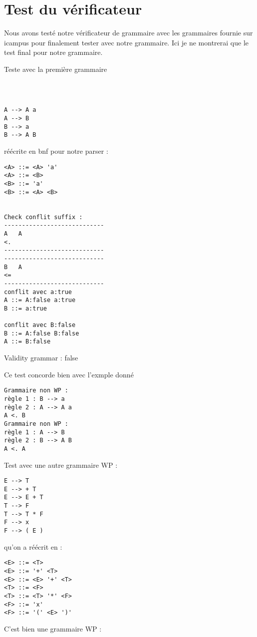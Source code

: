 \section{Test du vérificateur}
Nous avons testé notre vérificateur de grammaire avec les grammaires fournie sur icampus 
pour finalement tester avec notre grammaire. Ici je ne montrerai que le test final pour notre grammaire. 

Teste avec la première grammaire 
\begin{verbatim}
 


A --> A a 
A --> B 
B --> a 
B --> A B 
\end{verbatim}


réécrite en bnf pour notre parser :
\begin{verbatim}
<A> ::= <A> 'a'
<A> ::= <B>
<B> ::= 'a'
<B> ::= <A> <B>


Check conflit suffix : 
----------------------------
A   A
<.
----------------------------
----------------------------
B   A
<=
----------------------------
conflit avec a:true
A ::= A:false a:true
B ::= a:true 

conflit avec B:false
B ::= A:false B:false
A ::= B:false 
\end{verbatim}

Validity grammar : false


Ce test concorde bien avec l'exmple donné

\begin{verbatim}
Grammaire non WP :
règle 1 : B --> a 
règle 2 : A --> A a
A <. B
Grammaire non WP :
règle 1 : A --> B 
règle 2 : B --> A B
A <. A

\end{verbatim}



Test avec une autre grammaire WP :

\begin{verbatim}
E --> T 
E --> + T 
E --> E + T 
T --> F 
T --> T * F 
F --> x 
F --> ( E ) 
\end{verbatim}

qu'on a réécrit en :
\begin{verbatim}
<E> ::= <T> 
<E> ::= '+' <T> 
<E> ::= <E> '+' <T> 
<T> ::= <F> 
<T> ::= <T> '*' <F> 
<F> ::= 'x' 
<F> ::= '(' <E> ')' 
\end{verbatim}

C'est bien une grammaire WP :

